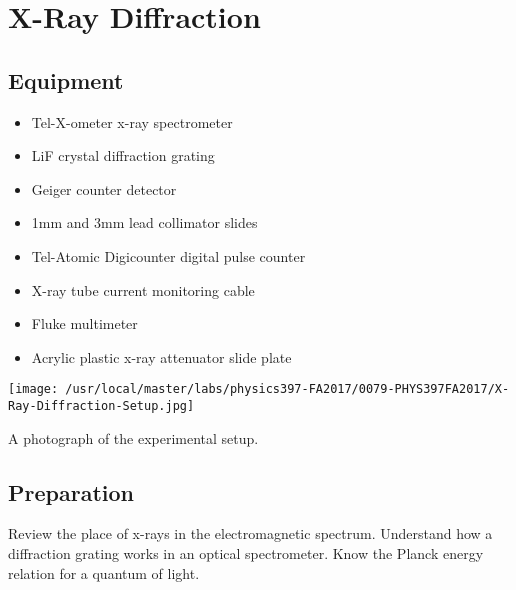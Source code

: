 

%
%


\setcounter{chapter}{9}
\setcounter{equation}{0}
\setcounter{table}{0}
\setcounter{figure}{0}
\chapter{X-Ray Diffraction}

\section{Equipment}

\begin{minipage}[t]{0.5\textwidth}
\begin{itemize}[noitemsep]
\item Tel-X-ometer x-ray spectrometer
\item LiF crystal diffraction grating
\item Geiger counter detector
\item 1mm and 3mm lead collimator slides
\end{itemize}
\end{minipage}
\begin{minipage}[t]{0.5\textwidth}
\begin{itemize}[noitemsep]
\item Tel-Atomic Digicounter digital pulse counter
\item X-ray tube current monitoring cable
\item Fluke multimeter
\item Acrylic plastic x-ray attenuator slide plate
\end{itemize}
\end{minipage}

\begin{marginfigure}[+1.5in]
\texttt{[image: /usr/local/master/labs/physics397-FA2017/0079-PHYS397FA2017/X-Ray-Diffraction-Setup.jpg]}
\caption{A photograph of the experimental setup.}
\label{fig:XRsetup}
\end{marginfigure}

\section{Preparation}
Review the place of x-rays in the electromagnetic spectrum. Understand how a diffraction grating works in an optical spectrometer. Know the Planck energy relation for a quantum of light.

